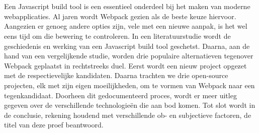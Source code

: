 

\chapter*{}
Een Javascript build tool is een essentieel onderdeel bij het maken van moderne webapplicaties. Al jaren wordt Webpack gezien als de beste keuze hiervoor. Aangezien er genoeg andere opties zijn, vele met een nieuwe aanpak, is het wel eens tijd om die bewering te controleren. In een literatuurstudie wordt de geschiedenis en werking van een Javascript build tool geschetst. Daarna, aan de hand van een vergelijkende studie, worden drie populaire alternatieven tegenover Webpack geplaatst in rechtstreeks duel. Eerst wordt een nieuw project opgezet met de respectievelijke kandidaten. Daarna trachten we drie open-source projecten, elk met zijn eigen moeilijkheden, om te vormen van Webpack naar een tegenkandidaat. Doorheen dit gedocumenteerd proces, wordt er meer uitleg gegeven over de verschillende technologieën die aan bod komen. Tot slot wordt in de conclusie, rekening houdend met verschillende ob- en subjectieve factoren, de titel van deze proef beantwoord.


